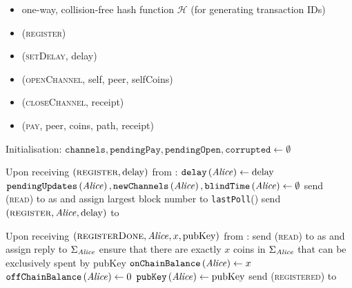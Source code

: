 \begin{functionality}{\fpaynet}
  \label{alg:payfunc}
    \begin{itemize}
      \item one-way, collision-free hash function $\mathcal{H}$ (for generating
      transaction IDs)
    \end{itemize}

    \begin{itemize}
      \item (\textsc{register})
      \item (\textsc{setDelay}, delay)
      \item (\textsc{openChannel}, self, peer, selfCoins)
      \item (\textsc{closeChannel}, receipt)
      \item (\textsc{pay}, peer, coins, path, receipt)
    \end{itemize}

  \begin{algorithmic}[1]
    \State Initialisation:
    \Indent
      \State $\mathtt{channels}, \mathtt{pendingPay}, \mathtt{pendingOpen},
      \mathtt{corrupted} \gets \emptyset$
    \EndIndent
    \State
  \end{algorithmic}

  \begin{algorithmic}[1]
    \State Upon receiving $\left(\textsc{register}, \mathrm{delay}\right)$ from
    \alice:
    \Indent
      \State $\mathtt{delay}\left(\mathit{Alice}\right) \gets \mathrm{delay}$
      \State $\mathtt{pendingUpdates}\left(\mathit{Alice}\right),
      \mathtt{newChannels}\left(\mathit{Alice}\right),
      \mathtt{blindTime}\left(\mathit{Alice}\right) \gets \emptyset$
      \State send (\textsc{read}) to \ledger{} as \alice{} and assign largest
      block number to \texttt{lastPoll}(\alice)
      \State send $\left(\textsc{register}, \mathit{Alice}, \mathrm{delay}\right)$ to
      \simulator
    \EndIndent
    \State

    \State Upon receiving $\left(\textsc{registerDone}, \mathit{Alice}, x,
    \mathrm{pubKey}\right)$ from \simulator:
    \Indent
      \State send (\textsc{read}) to \ledger{} as \alice{} and assign reply to
      $\Sigma_{\mathit{Alice}}$
      \State ensure that there are exactly $x$ coins in $\Sigma_{\mathit{Alice}}$ that
      can be exclusively spent by pubKey
      \State $\mathtt{onChainBalance}\left(\mathit{Alice}\right) \gets x$
      \State $\mathtt{offChainBalance}\left(\mathit{Alice}\right) \gets 0$
      \State $\mathtt{pubKey}\left(\mathit{Alice}\right) \gets \mathrm{pubKey}$
      \State send (\textsc{registered}) to \alice
    \EndIndent
    \State


\end{algorithmic}
\end{functionality}
